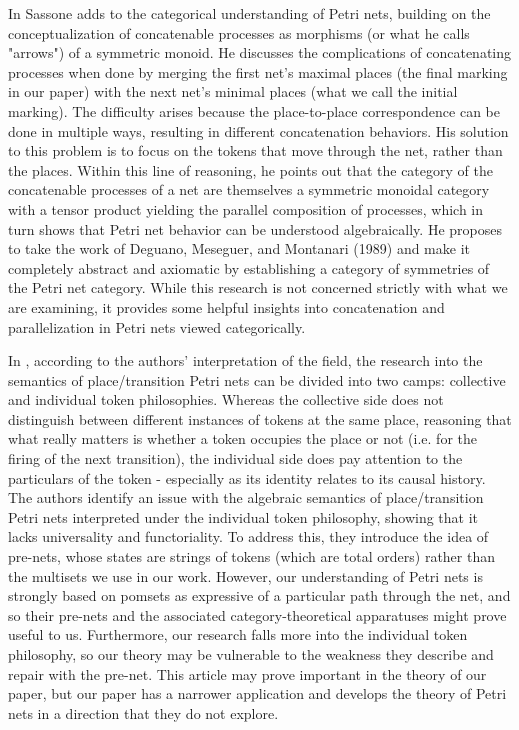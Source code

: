 \par In \cite{SASSONE1996277} Sassone adds to the categorical understanding of Petri nets, building on the conceptualization of concatenable processes as morphisms (or what he calls "arrows") of a symmetric monoid. He discusses the complications of concatenating processes when done by merging the first net's maximal places (the final marking in our paper) with the next net's minimal places (what we call the initial marking). The difficulty arises because the place-to-place correspondence can be done in multiple ways, resulting in different concatenation behaviors. His solution to this problem is to focus on the tokens that move through the net, rather than the places.  Within this line of reasoning,  he points out that the category of the concatenable processes of a net are themselves a symmetric monoidal category with a tensor product yielding the parallel composition of processes, which in turn shows that Petri net behavior can be understood algebraically. He proposes to take the work of Deguano, Meseguer, and Montanari (1989) and make it completely abstract and axiomatic by establishing a category of symmetries of the Petri net category. While this research is not concerned strictly with what we are examining, it provides some helpful insights into concatenation and parallelization in Petri nets viewed categorically.
\par In \cite{BRUNI2001207}, according to the authors' interpretation of the field, the research into the semantics of place/transition Petri nets can be divided into two camps: collective and individual token philosophies. Whereas the collective side does not distinguish between different instances of tokens at the same place, reasoning that what really matters is whether a token occupies the place or not (i.e. for the firing of the next transition), the individual side does pay attention to the particulars of the token - especially as its identity relates to its causal history. The authors identify an issue with the algebraic semantics of place/transition Petri nets interpreted under the individual token philosophy, showing that it lacks universality and functoriality. To address this, they introduce the idea of pre-nets, whose states are strings of tokens (which are total orders) rather than the multisets we use in our work. However, our understanding of Petri nets is strongly based on pomsets as expressive of a particular path through the net, and so their pre-nets and the associated category-theoretical apparatuses might prove useful to us. Furthermore, our research falls more into the individual token philosophy, so our theory may be vulnerable to the weakness they describe and repair with the pre-net. This article may prove important in the theory of our paper, but our paper has a narrower application and develops the theory of Petri nets in a direction that they do not explore.
